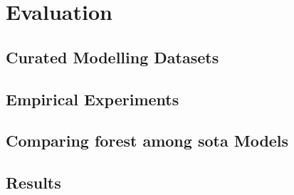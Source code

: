 



\chapter{Evaluation}
\label{chap:eval}

\section{Curated Modelling Datasets}
\label{sec:cura-model-data}


\section{Empirical Experiments}
\label{sec:experiments}

\section{Comparing \acrshort{forest} among \acrshort{sota} Models}
\label{sec:compa-sota}

\section{Results}
\label{sec:results}
